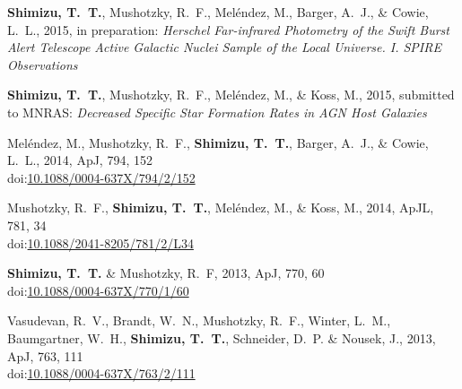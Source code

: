 \documentclass[10pt]{article}
\makeatletter
\newlength{\bibhang}
\newlength{\bibsep}
 {\@listi \global\bibsep\itemsep \global\advance\bibsep by\parsep}
\newenvironment{bibsection}%
        {\begin{list}{}{%
       \setlength{\leftmargin}{\bibhang}%
       \setlength{\itemindent}{-\leftmargin}%
       \setlength{\itemsep}{\bibsep}%
       \setlength{\parsep}{\z@}%
        \setlength{\partopsep}{0pt}%
        \setlength{\topsep}{0pt}}}
        {\end{list}\vspace{-.6\baselineskip}}
\newcommand\doilink[1]{\href{http://dx.doi.org/#1}{#1}}
\newcommand\doi[1]{doi:\doilink{#1}}
\makeatother
\begin{document}
\begin{bibsection}
    \item  \textbf{Shimizu, T.~T.}, Mushotzky, R.~F., Mel\'endez, M., Barger, A.~J., \& Cowie, L.~L., 2015, in preparation: \emph{Herschel Far-infrared Photometry of the Swift Burst Alert Telescope Active Galactic Nuclei Sample of the Local Universe. I. SPIRE Observations}
    \item  \textbf{Shimizu, T.~T.}, Mushotzky, R.~F., Mel\'endez, M., \& Koss, M., 2015, submitted to MNRAS: \emph{Decreased Specific Star Formation Rates in AGN Host Galaxies}
    \item Mel\'endez, M., Mushotzky, R.~F., \textbf{Shimizu, T.~T.},  Barger, A.~J., \& Cowie, L.~L., 2014, ApJ, 794, 152\\%
    \doi{10.1088/0004-637X/794/2/152}
     \item Mushotzky, R.~F., \textbf{Shimizu, T.~T.}, Mel\'endez, M., \& Koss, M., 2014, ApJL, 781, 34\\%
         \doi{10.1088/2041-8205/781/2/L34}
     \item \textbf{Shimizu, T.~T.} \& Mushotzky, R.~F, 2013, ApJ, 770, 60\\%
        \doi{10.1088/0004-637X/770/1/60}
    \item Vasudevan, R.~V., Brandt, W.~N., Mushotzky, R.~F., 
	Winter, L.~M., Baumgartner, W.~H., \textbf{Shimizu, T.~T.}, 
	Schneider, D.~P. \& Nousek, J., 2013, ApJ, 763, 111\\%
        \doi{10.1088/0004-637X/763/2/111}
   
    \end{bibsection}

%
\end{document}
